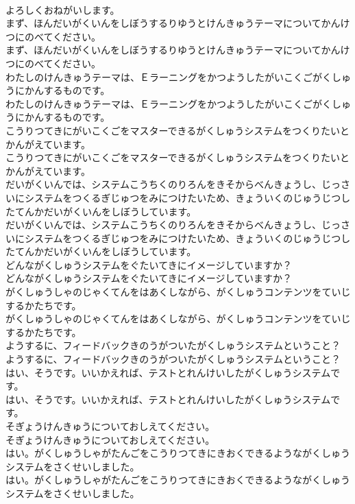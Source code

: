 \documentclass[8pt]{extreport}
\begin{document}
\begin{CJK}{UTF8}{min}
\\	よろしくおねがいします。
\\	まず、ほんだいがくいんをしぼうするりゆうとけんきゅうテーマについてかんけつにのべてください。
\\	まず、ほんだいがくいんをしぼうするりゆうとけんきゅうテーマについてかんけつにのべてください。
\\	わたしのけんきゅうテーマは、Ｅラーニングをかつようしたがいこくごがくしゅうにかんするものです。
\\	わたしのけんきゅうテーマは、Ｅラーニングをかつようしたがいこくごがくしゅうにかんするものです。
\\	こうりつてきにがいこくごをマスターできるがくしゅうシステムをつくりたいとかんがえています。
\\	こうりつてきにがいこくごをマスターできるがくしゅうシステムをつくりたいとかんがえています。
\\	だいがくいんでは、システムこうちくのりろんをきそからべんきょうし、じっさいにシステムをつくるぎじゅつをみにつけたいため、きょういくのじゅうじつしたてんかだいがくいんをしぼうしています。
\\	だいがくいんでは、システムこうちくのりろんをきそからべんきょうし、じっさいにシステムをつくるぎじゅつをみにつけたいため、きょういくのじゅうじつしたてんかだいがくいんをしぼうしています。
\\	どんながくしゅうシステムをぐたいてきにイメージしていますか？
\\	どんながくしゅうシステムをぐたいてきにイメージしていますか？
\\	がくしゅうしゃのじゃくてんをはあくしながら、がくしゅうコンテンツをていじするかたちです。
\\	がくしゅうしゃのじゃくてんをはあくしながら、がくしゅうコンテンツをていじするかたちです。
\\	ようするに、フィードバックきのうがついたがくしゅうシステムということ？
\\	ようするに、フィードバックきのうがついたがくしゅうシステムということ？
\\	はい、そうです。いいかえれば、テストとれんけいしたがくしゅうシステムです。
\\	はい、そうです。いいかえれば、テストとれんけいしたがくしゅうシステムです。
\\	そぎょうけんきゅうについておしえてください。
\\	そぎょうけんきゅうについておしえてください。
\\	はい。がくしゅうしゃがたんごをこうりつてきにきおくできるようながくしゅうシステムをさくせいしました。
\\	はい。がくしゅうしゃがたんごをこうりつてきにきおくできるようながくしゅうシステムをさくせいしました。

\end{CJK}
\end{document}
